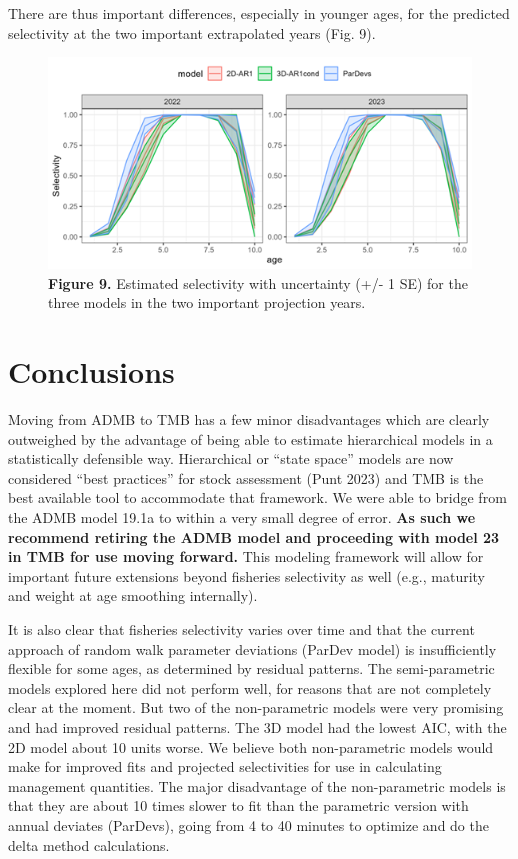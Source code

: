 \documentclass[
]{article}
\begin{document}
There are thus important differences, especially in younger ages, for
the predicted selectivity at the two important extrapolated years (Fig.
9).

\begin{figure}
\hypertarget{fig:figure9}{%
\centering
\includegraphics{Results/Figure9_selectivity_at_age_projections.png}
\caption{\textbf{Figure 9.} Estimated selectivity with uncertainty (+/-
1 SE) for the three models in the two important projection
years.}\label{fig:figure9}
}
\end{figure}

\hypertarget{conclusions}{%
\section{Conclusions}\label{conclusions}}

Moving from ADMB to TMB has a few minor disadvantages which are clearly
outweighed by the advantage of being able to estimate hierarchical
models in a statistically defensible way. Hierarchical or ``state
space'' models are now considered ``best practices'' for stock
assessment (Punt 2023) and TMB is the best available tool to accommodate
that framework. We were able to bridge from the ADMB model 19.1a to
within a very small degree of error. \textbf{As such we recommend
retiring the ADMB model and proceeding with model 23 in TMB for use
moving forward. } This modeling framework will allow for important
future extensions beyond fisheries selectivity as well (e.g., maturity
and weight at age smoothing internally).

It is also clear that fisheries selectivity varies over time and that
the current approach of random walk parameter deviations (ParDev model)
is insufficiently flexible for some ages, as determined by residual
patterns. The semi-parametric models explored here did not perform well,
for reasons that are not completely clear at the moment. But two of the
non-parametric models were very promising and had improved residual
patterns. The 3D model had the lowest AIC, with the 2D model about 10
units worse. We believe both non-parametric models would make for
improved fits and projected selectivities for use in calculating
management quantities. The major disadvantage of the non-parametric
models is that they are about 10 times slower to fit than the parametric
version with annual deviates (ParDevs), going from 4 to 40 minutes to
optimize and do the delta method calculations.
\end{document}
